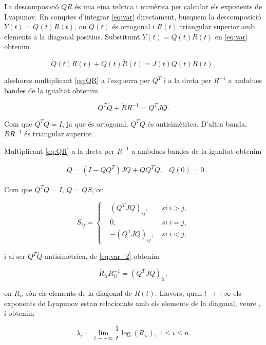 \documentclass[11pt,a4paper,openright,oneside]{article}
\numberwithin{equation}{section}
\theoremstyle{definition}
\begin{document}
La descomposició $QR$ és una eina teòrica i numèrica per calcular els exponents de Lyapunov. En comptes d'integrar \eqref{eq:var} directament, busquem la descomposició $Y(t)=Q(t)R(t)$, on $Q(t)$ és ortogonal i $R(t)$ triangular superior amb elements a la diagonal positius. Substituint $Y(t)=Q(t)R(t)$ en \eqref{eq:var} obtenim 

\begin{equation}\label{eq:QR}
    \dot{Q}(t)R(t)+Q(t)\dot{R}(t)=J(t)Q(t)R(t),
\end{equation}

aleshores multiplicant \eqref{eq:QR} a l'esquerra per $Q^T$ i a la dreta per $R^{-1}$ a ambdues bandes de la igualtat obtenim 

\begin{equation}\label{eq:var_2}
    Q^T\dot{Q}+\dot{R}R^{-1}=Q^TJQ.
\end{equation}

Com que $Q^TQ=I$, ja que és ortogonal, $Q^T\dot{Q}$ és antisimètrica. D'altra banda, $\dot{R}R^{-1}$ és triangular superior. 

Multiplicant \eqref{eq:QR} a la dreta per $R^{-1}$ a ambdues bandes de la igualtat obtenim

\begin{equation*} \begin{aligned}
    &\dot{Q}=(I-QQ^T)JQ+QQ^T\dot{Q},
    &Q(0)=0.
\end{aligned} \end{equation*}

Com que $Q^TQ=I$, $\dot{Q}=QS$, on 

\begin{equation} \label{eq:S}
    S_{ij}=\left\{ \begin{aligned} 
            &(Q^TJQ)_{ij},  \ &si \ i > j, \\
            &0, \ &si \ i=j, \\
            & -(Q^TJQ)_{ij}, \ &si \ i < j,
        \end{aligned} \right.    
\end{equation}

i al ser $Q^T\dot{Q}$ antisimètrica, de \eqref{eq:var_2} obtenim 

\begin{equation*}
    \dot{R}_{ii}R^{-1}_{ii}=(Q^TJQ)_{ii},
\end{equation*}

on $R_{ii}$ són els elements de la diagonal de $R(t)$. Llavors, quan $t\to+\infty$ els exponents de Lyapunov estan relacionats amb els elements de la diagonal, veure \cite{Exponents_lyapunov}, i obtenim 

\begin{equation*}
    \lambda_i = \lim_{t\to+\infty}\frac{1}{t}\log(R_{ii}), \ 1\leq i \leq n.
\end{equation*}

\newpage



\end{document}
